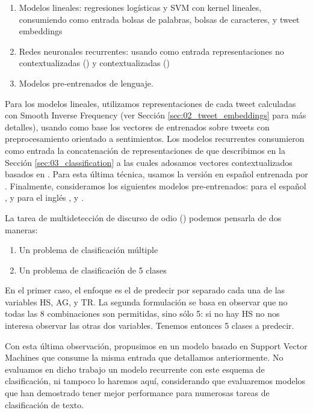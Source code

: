 \begin{enumerate}
    \item Modelos lineales: regresiones logísticas y SVM con kernel lineales, consumiendo como entrada bolsas de palabras, bolsas de caracteres, y tweet embeddings
    \item Redes neuronales recurrentes: usando como entrada representaciones no contextualizadas (\fasttext{}) y  contextualizadas (\elmo{})
    \item Modelos pre-entrenados de lenguaje.
\end{enumerate}

Para los modelos lineales, utilizamos representaciones de cada tweet calculadas con Smooth Inverse Frequency (ver Sección \ref{sec:02_tweet_embeddings} para más detalles), usando como base los vectores de \fasttext{} entrenados sobre tweets con preprocesamiento orientado a sentimientos. Los modelos recurrentes consumieron como entrada la concatenación de representaciones de \fasttext{} que describimos en la Sección \ref{sec:03_classification} a las cuales adosamos vectores contextualizados basados en \elmo{}. \cite{peters2018} Para esta última técnica, usamos la versión en español entrenada por \citet{che-EtAl:2018:K18-2}. Finalmente, consideramos los siguientes modelos pre-entrenados: para el español \beto{} \cite{canete2020spanish}, y para el inglés \bert{} \cite{devlin2018bert}, \roberta{} \cite{liu2019roberta} y \bertweet{}. \cite{dat2020bertweet}

La tarea de multidetección de discurso de odio (\subtaskb{}) podemos pensarla de dos maneras:

\begin{enumerate}
    \item Un problema de clasificación múltiple
    \item Un problema de clasificación de 5 clases
\end{enumerate}

En el primer caso, el enfoque es el de predecir por separado cada una de las variables HS, AG, y TR. La segunda formulación se basa en observar que no todas las 8 combinaciones son permitidas, sino sólo 5: si no hay HS no nos interesa observar las otras dos variables. Tenemos entonces 5 clases a predecir.

Con esta última observación, propusimos en \citet{atalaya_tass2018} un modelo basado en Support Vector Machines que consume la misma entrada que detallamos anteriormente. No evaluamos en dicho trabajo un modelo recurrente con este esquema de clasificación, ni tampoco lo haremos aquí, considerando que evaluaremos modelos que han demostrado tener mejor performance para numerosas tareas de clasificación de texto.


